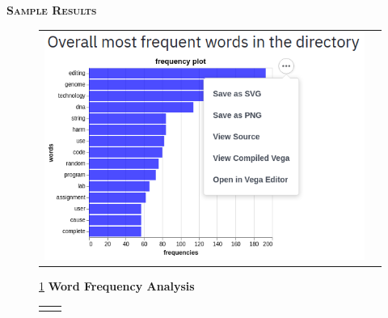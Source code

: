 \documentclass[final,t]{beamer}
\begin{document}
\begin{frame}{}
\begin{columns}
\begin{column}{.5\linewidth}
\begin{block}{\textsc{\textbf{Sample Results}}}
			\begin{figure}
				\begin{tabular}{cc}
					\hspace*{5mm}
					\includegraphics[scale = 1.5]{graphics/freqWords.png}
				\end{tabular}				
				\caption{\ref{fig:freqWords} \textbf{Word Frequency Analysis}}
				\label{fig:freqWords}
			\end{figure}
			\vspace*{3mm}


			\vspace*{3mm}
			\begin{figure}
				\begin{tabular}{cc}
					\hspace*{5mm}


\end{tabular}
\end{figure}
\end{block}
\end{column}
\end{columns}
\end{frame}
\end{document}
